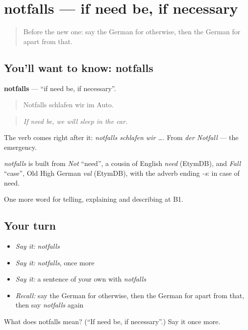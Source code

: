 \section[notfalls]{notfalls — if need be, if necessary}

\label{lesson:GE-C365-notfalls}



\begin{quote}
Before the new one: say the German for otherwise, then the German for apart from that.
\end{quote}

\subsection*{You'll want to know: notfalls}
\textbf{notfalls} — \textquotedblleft{}if need be, if necessary\textquotedblright{}.

\begin{quote}
Notfalls schlafen wir im Auto.
\end{quote}

\begin{quote}
\emph{If need be, we will sleep in the car.}
\end{quote}

The verb comes right after it: \emph{notfalls schlafen wir …}. From \emph{der Notfall} — the emergency.

\begin{cousinweb}
\emph{notfalls} is built from \emph{Not} \textquotedblleft{}need\textquotedblright{}, a cousin of English \emph{need} (EtymDB), and \emph{Fall} \textquotedblleft{}case\textquotedblright{}, Old High German \emph{val} (EtymDB), with the adverb ending \emph{-s}: in case of need.
\end{cousinweb}

\begin{grammarlens}[title={What you've built}]
One more word for telling, explaining and describing at B1.
\end{grammarlens}

\subsection*{Your turn}
\begin{itemize}
\raggedright
  \item \emph{Say it:} \emph{notfalls}
  \item \emph{Say it:} \emph{notfalls}, once more
  \item \emph{Say it:} a sentence of your own with \emph{notfalls}
  \item \emph{Recall:} say the German for otherwise, then the German for apart from that, then say \emph{notfalls} again
\end{itemize}

\begin{tcolorbox}[breakable,colback=teal!4,colframe=teal!35!black,title={Before you move on}]
What does notfalls mean? (\textquotedblleft{}If need be, if necessary\textquotedblright{}.) Say it once more.
\end{tcolorbox}
